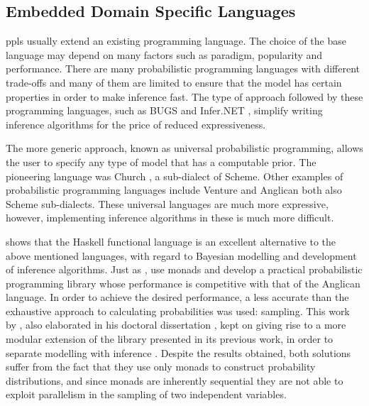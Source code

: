 \documentclass[
  oneside,
  11pt, a4paper,
  footinclude=true,
  headinclude=true,
  cleardoublepage=empty
]{scrbook}
\theoremstyle{definition}
\theoremstyle{definition}
\begin{document}
        \subsection{Embedded Domain Specific Languages}\label{rel-work-edsl}
        
        \glspl{ppl} usually extend an existing programming language. The choice of the base language may depend on many factors such as paradigm, popularity and performance. There are many probabilistic programming languages with different trade-offs \citep{Scibior:2015:PPP:2887747.2804317} and many of them are limited to ensure that the model has certain properties in order to make inference fast. The type of approach followed by these programming languages, such as BUGS \citep{gilks1994language} and Infer.NET \citep{minkainfer}, simplify writing inference algorithms for the price of reduced expressiveness.
        
        The more generic approach, known as universal probabilistic programming, allows the user to specify any type of model that has a computable prior. The pioneering language was Church \citep{goodman2012church}, a sub-dialect of Scheme. Other examples of probabilistic programming languages include Venture and Anglican \citep{mansinghka2014venture, tolpin2015probabilistic} both also Scheme sub-dialects. These universal languages are much more expressive, however, implementing inference algorithms in these is much more difficult.
                
        \cite{Scibior:2015:PPP:2887747.2804317} shows that the Haskell functional language is an excellent alternative to the above mentioned languages, ​with regard to Bayesian modelling and development of inference algorithms. Just as \cite{erwig_kollmansberger_2006}, \cite{Scibior:2015:PPP:2887747.2804317} use monads and develop a practical probabilistic programming library whose performance is competitive with that of the Anglican language. In order to achieve the desired performance, a less accurate than the exhaustive approach to calculating probabilities was used: sampling. This work by \cite{Scibior:2015:PPP:2887747.2804317}, also elaborated in his doctoral dissertation \citep{Scibior19}, kept on giving rise to a more modular extension of the library presented in its previous work, in order to separate modelling with inference \citep{scibior2018functional}. Despite the results obtained, both solutions suffer from the fact that they use only monads to construct probability distributions, and since monads are inherently sequential they are not able to exploit parallelism in the sampling of two independent variables.
                
\end{document}
